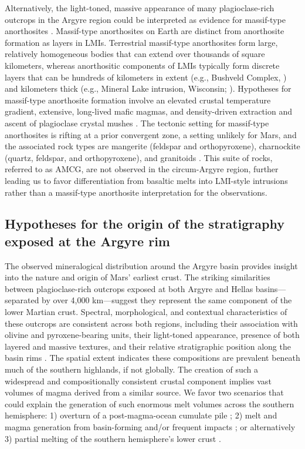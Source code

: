 \documentclass[12pt]{article}
\begin{document}
Alternatively, the light-toned, massive appearance of many plagioclase-rich outcrops in the Argyre region could be interpreted as evidence for massif-type anorthosites \citep{Ashwal1993, Arndt2013, Keller2024}. Massif-type anorthosites on Earth are distinct from anorthosite formation as layers in LMIs. Terrestrial massif-type anorthosites form large, relatively homogeneous bodies that can extend over thousands of square kilometers, whereas anorthositic components of LMIs typically form discrete layers that can be hundreds of kilometers in extent (e.g., Bushveld Complex, \citealt{Latypov2020}) and kilometers thick (e.g., Mineral Lake intrusion, Wisconsin; \citealt{Ashwal1993}). Hypotheses for massif-type anorthosite formation involve an elevated crustal temperature gradient, extensive, long-lived mafic magmas, and density-driven extraction and ascent of plagioclase crystal mushes \citep{Emslie1994, Keller2024}. The tectonic setting for massif-type anorthosites is rifting at a prior convergent zone, a setting unlikely for Mars, and the associated rock types are mangerite (feldspar and orthopyroxene), charnockite (quartz, feldspar, and orthopyroxene), and granitoids \citep{Emslie1994, Hamilton2010, Arndt2013, Keller2024}. This suite of rocks, referred to as AMCG, are not observed in the circum-Argyre region, further leading us to favor differentiation from basaltic melts into LMI-style intrusions rather than a massif-type anorthosite interpretation for the observations.

\subsection*{Hypotheses for the origin of the stratigraphy exposed at the Argyre rim}

The observed mineralogical distribution around the Argyre basin provides insight into the nature and origin of Mars' earliest crust. The striking similarities between plagioclase-rich outcrops exposed at both Argyre and Hellas basins---separated by over 4,000 km---suggest they represent the same component of the lower Martian crust. Spectral, morphological, and contextual characteristics of these outcrops are consistent across both regions, including their association with olivine and pyroxene-bearing units, their light-toned appearance, presence of both layered and massive textures, and their relative stratigraphic position along the basin rims \citep{Phillips2022}. The spatial extent indicates these compositions are prevalent beneath much of the southern highlands, if not globally. The creation of such a widespread and compositionally consistent crustal component implies vast volumes of magma derived from a similar source. We favor two scenarios that could explain the generation of such enormous melt volumes across the southern hemisphere: 1) overturn of a post-magma-ocean cumulate pile \citep{Borg2003, Elkins-Tanton2005}; 2) melt and magma generation from basin-forming and/or frequent impacts \citep{Koeppel2020, Manske2021, Black2024}; or alternatively 3) partial melting of the southern hemisphere's lower crust \citep{BonnetGibet2025, Bernadet2025}.
\end{document}

